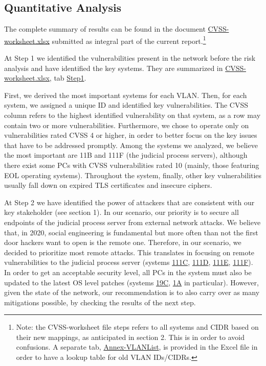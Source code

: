 \subsection{Quantitative Analysis}

The complete summary of results can be found in the document \url{CVSS-worksheet.xlsx} submitted as integral part of the current report.\footnote{Note: the CVSS-worksheet file steps refers to all systems and CIDR based on their new mappings, as anticipated in section 2. This is in order to avoid confusions. A separate tab, \url{Annex-VLANList}, is provided in the Excel file in order to have a lookup table for old VLAN IDs/CIDRs.}

At Step 1 we identified the vulnerabilities present in the network before the risk analysis and have identified the key systems. They are summarized in \url{CVSS-worksheet.xlsx}, tab \url{Step1}.

First, we derived the most important systems for each VLAN. Then, for each system, we assigned a unique ID and identified key vulnerabilities. The CVSS column refers to the highest identified vulnerability on that system, as a row may contain two or more vulnerabilities. Furthermore, we chose to operate only on vulnerabilities rated CVSS 4 or higher, in order to better focus on the key issues that have to be addressed promptly. Among the systems we analyzed, we believe the most important are 11B and 111F (the judicial process servers), although there exist some PCs with CVSS vulnerabilities rated 10 (mainly, those featuring EOL operating systems). Throughout the system, finally, other key vulnerabilities usually fall down on expired TLS certificates and insecure ciphers.

At Step 2 we have identified the power of attackers that are consistent with our key stakeholder (see section 1). In our scenario, our priority is to secure all endpoints of the judicial process server from external network attacks. We believe that, in 2020, social engineering is fundamental but more often than not the first door hackers want to open is the remote one\cite{ferrarella_2018}\cite{salerno_2018}. Therefore, in our scenario, we decided to prioritize most remote attacks. This translates in focusing on remote vulnerabilities to the judicial process server (systems \url{111C}, \url{111D}, \url{111E}, \url{111F}). In order to get an acceptable security level, all PCs in the system must also be updated to the latest OS level patches (systems \url{19C}, \url{1A} in particular). However, given the state of the network, our recommendation is to also carry over as many mitigations possible, by checking the results of the next step.

